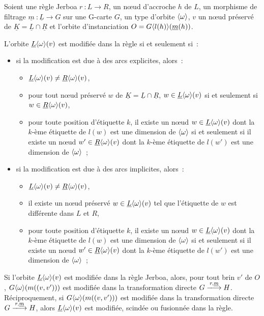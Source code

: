 \begin{proposition}
	Soient une règle Jerboa $r~: L \longrightarrow R$, un n\oe ud d'accroche $h$ de $L$, un morphisme de filtrage $\underline{m}~: \underline{L} \rightarrow G$ sur une G-carte $G$, un type d'orbite $\langle\omega\rangle$, $v$ un n\oe ud préservé de $\underline{K} = \underline{L} \cap \underline{R}$ et l'orbite d'instanciation	$O = G\langle l(h)\rangle(\underline{m}(h))$.

	L'orbite $\underline{L}\langle\omega\rangle(v)$ est modifiée dans la règle si et seulement si~:
	\begin{itemize}
		\item si la modification est due à des arcs explicites, alors~:
		      \begin{itemize}
			      \item $\underline{L}\langle\omega\rangle(v) \neq \underline{R}\langle\omega\rangle(v)$,
			      \item pour tout n\oe ud préservé $w$ de $\underline{K} = \underline{L} \cap \underline{R}$, $w \in \underline{L}\langle\omega\rangle(v)$ si et seulement si $w \in \underline{R}\langle\omega\rangle(v)$,
			      \item pour toute position d'étiquette $k$, il existe un n\oe ud $w \in \underline{L}\langle\omega\rangle(v)$ dont la $k$-ème étiquette de $l(w)$ est une dimension de $\langle\omega\rangle$ si et seulement si il existe un n\oe ud $w' \in \underline{R}\langle\omega\rangle(v)$ dont la $k$-ème étiquette de $l(w')$ est une dimension de $\langle\omega\rangle$~;
		      \end{itemize}
		\item si la modification est due à des arcs implicites, alors~:
		      \begin{itemize}
			      \item $\underline{L}\langle\omega\rangle(v) \neq \underline{R}\langle\omega\rangle(v)$,
			      \item il existe un n\oe ud préservé $w \in \underline{L}\langle\omega\rangle(v)$ tel que l'étiquette de $w$ est différente dans $L$ et $R$,
			      \item pour toute position d'étiquette $k$, il existe un n\oe ud $w \in \underline{L}\langle\omega\rangle(v)$ dont la $k$-ème étiquette de $l(w)$ est une dimension de $\langle\omega\rangle$ si et seulement si il existe un n\oe ud $w' \in \underline{R}\langle\omega\rangle(v)$ dont la $k$-ème étiquette de $l(w')$ est une dimension de $\langle\omega\rangle$~;
		      \end{itemize}
	\end{itemize}


	Si l'orbite $\underline{L}\langle\omega\rangle(v)$ est modifiée dans la règle Jerboa, alors, pour tout brin $v'$ de $O$,
	$G\langle\omega\rangle(m((v,v')))$ est modifiée dans la transformation directe
	$G \xlongrightarrow{r,\underline{m}} H$. %
	Réciproquement, si 	$G\langle\omega\rangle(m((v,v')))$ est modifiée dans la transformation directe
	$G \xlongrightarrow{r,\underline{m}} H$, alors $\underline{L}\langle\omega\rangle(v)$ est modifiée, scindée ou fusionnée dans la règle. %
\end{proposition}

